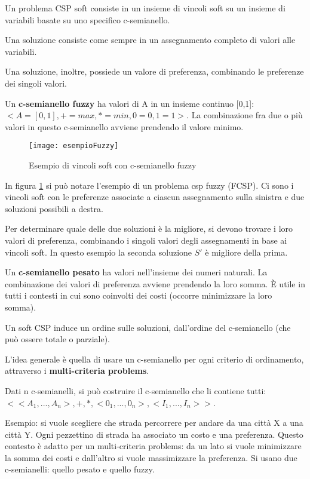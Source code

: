 Un problema CSP soft consiste in un insieme di vincoli soft su un insieme di
variabili basate su uno specifico c-semianello.

Una soluzione consiste come sempre in un assegnamento completo di valori alle
variabili.

Una soluzione, inoltre, possiede un valore di preferenza, combinando le
preferenze dei singoli valori.

Un \textbf{c-semianello fuzzy} ha valori di A in un insieme continuo [0,1]:
$<A = [0,1], + = max, * = min, 0 = 0, 1 = 1>$. La combinazione fra due o
più valori in questo c-semianello avviene prendendo il valore minimo.

\begin{figure}[H]
\centering
\texttt{[image: esempioFuzzy]}
\caption{Esempio di vincoli soft con c-semianello fuzzy}
\label{fig:esempioFuzzy}
\end{figure}

In figura \ref{fig:esempioFuzzy} si può notare l'esempio di un problema
csp fuzzy (FCSP). Ci sono i vincoli soft con le preferenze associate a
ciascun assegnamento sulla sinistra e due soluzioni possibili a destra.

Per determinare quale delle due soluzioni è la migliore, si devono trovare
i loro valori di preferenza, combinando i singoli valori degli assegnamenti
in base ai vincoli soft. In questo esempio la seconda soluzione $S'$ è
migliore della prima.

Un \textbf{c-semianello pesato} ha valori nell'insieme dei numeri naturali.
La combinazione dei valori di preferenza avviene prendendo la loro somma.
È utile in tutti i contesti in cui sono coinvolti dei costi (occorre
minimizzare la loro somma).

Un soft CSP induce un ordine sulle soluzioni, dall'ordine del c-semianello
(che può ossere totale o parziale).

L'idea generale è quella di usare un c-semianello per ogni criterio di
ordinamento, attraverso i \textbf{multi-criteria problems}.

Dati n c-semianelli, si può costruire il c-semianello che li contiene
tutti:
$<<A_1,...,A_n>, +, *, <0_1,...,0_n>,<I_1,...,I_n>>$.

Esempio: si vuole scegliere che strada percorrere per andare da una città
X a una città Y. Ogni pezzettino di strada ha associato un costo e una
preferenza.
Questo contesto è adatto per un multi-criteria problems: da un lato si
vuole minimizzare la somma dei costi e dall'altro si vuole massimizzare
la preferenza. Si usano due c-semianelli: quello pesato e quello fuzzy.

